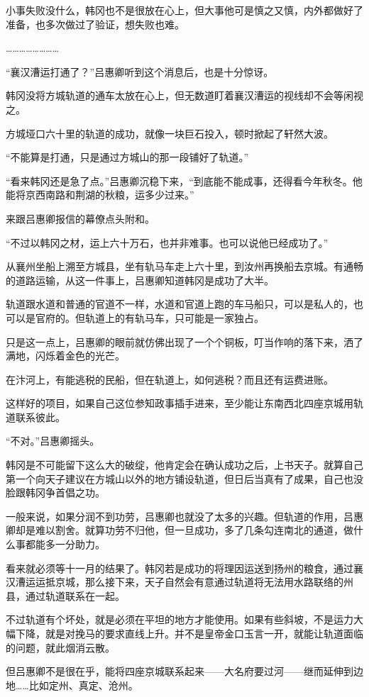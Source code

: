 小事失败没什么，韩冈也不是很放在心上，但大事他可是慎之又慎，内外都做好了准备，也多次做过了验证，想失败也难。

……………………

“襄汉漕运打通了？”吕惠卿听到这个消息后，也是十分惊讶。

韩冈没将方城轨道的通车太放在心上，但无数道盯着襄汉漕运的视线却不会等闲视之。

方城垭口六十里的轨道的成功，就像一块巨石投入，顿时掀起了轩然大波。

“不能算是打通，只是通过方城山的那一段铺好了轨道。”

“看来韩冈还是急了点。”吕惠卿沉稳下来，“到底能不能成事，还得看今年秋冬。他能将京西南路和荆湖的秋粮，运多少过来。”

来跟吕惠卿报信的幕僚点头附和。

“不过以韩冈之材，运上六十万石，也并非难事。也可以说他已经成功了。”

从襄州坐船上溯至方城县，坐有轨马车走上六十里，到汝州再换船去京城。有通畅的道路运输，从这一件事上，吕惠卿知道韩冈是成功了大半。

轨道跟水道和普通的官道不一样，水道和官道上跑的车马船只，可以是私人的，也可以是官府的。但轨道上的有轨马车，只可能是一家独占。

只是这一点上，吕惠卿的眼前就仿佛出现了一个个铜板，叮当作响的落下来，洒了满地，闪烁着金色的光芒。

在汴河上，有能逃税的民船，但在轨道上，如何逃税？而且还有运费进账。

这样好的项目，如果自己这位参知政事插手进来，至少能让东南西北四座京城用轨道联系彼此。

“不对。”吕惠卿摇头。

韩冈是不可能留下这么大的破绽，他肯定会在确认成功之后，上书天子。就算自己第一个向天子建议在方城山以外的地方铺设轨道，但日后当真有了成果，自己也没脸跟韩冈争首倡之功。

一般来说，如果分润不到功劳，吕惠卿也就没了太多的兴趣。但轨道的作用，吕惠卿却是难以割舍。就算功劳不归他，但一旦成功，多了几条勾连南北的通道，做什么事都能多一分助力。

看来就必须等十一月的结果了。韩冈若是成功的将理因运送到扬州的粮食，通过襄汉漕运运抵京城，那么接下来，天子自然会有意通过轨道将无法用水路联络的州县，通过轨道联系在一起。

不过轨道有个坏处，就是必须在平坦的地方才能使用。如果有些斜坡，不是运力大幅下降，就是对挽马的要求直线上升。并不是皇帝金口玉言一开，就能让轨道面临的问题，就此烟消云散。

但吕惠卿不是很在乎，能将四座京城联系起来——大名府要过河——继而延伸到边地……比如定州、真定、沧州。

